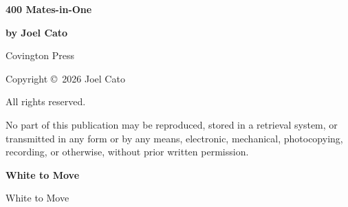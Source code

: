 \documentclass[12pt,twoside]{article}
\begin{document}

\thispagestyle{empty}

\vspace*{0.16\textheight}

\begin{center}
{\Huge\bfseries 400 Mates-in-One\par}
\end{center}

\vspace*{0.14\textheight}

\begin{center}
\begin{minipage}{0.52\textwidth}
\centering
{\LARGE\bfseries by Joel Cato\par}
\end{minipage}
\end{center}

\vfill

\begin{center}
{\normalsize Covington Press\par}
\end{center}

\newpage

\thispagestyle{empty}

\vspace*{0.72\textheight}

\begin{center}
\small
Copyright \copyright\ 2026 Joel Cato

All rights reserved.

No part of this publication may be reproduced, stored in a retrieval system,
or transmitted in any form or by any means, electronic, mechanical,
photocopying, recording, or otherwise, without prior written permission.
\end{center}

\newpage




\newpage
\checkoddpage\ifoddpage\else\null\thispagestyle{empty}\newpage\fi
{}

\begin{center}
\Large\bfseries White to Move

\vspace{0.15em}
\normalsize White to Move
\end{center}
\end{document}
